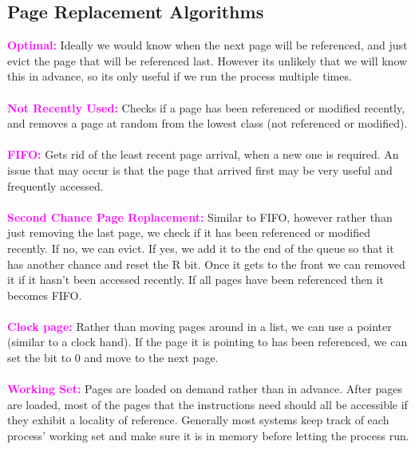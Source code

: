 \documentclass[a4paper,10pt]{article}
\begin{document}
\subsection{Page Replacement Algorithms}
\textcolor{Magenta}{\textbf{Optimal:}} Ideally we would know when the next page will be referenced, and just evict the page that will be referenced last. However its unlikely that we will know this in advance, so its only useful if we run the process multiple times. \\\\
\textcolor{Magenta}{\textbf{Not Recently Used:}} Checks if a page has been referenced or modified recently, and removes a page at random from the lowest class (not referenced or modified). \\\\
\textcolor{Magenta}{\textbf{FIFO:}} Gets rid of the least recent page arrival, when a new one is required. An issue that may occur is that the page that arrived first may be very useful and frequently accessed.\\\\
\textcolor{Magenta}{\textbf{Second Chance Page Replacement:}} Similar to FIFO, however rather than just removing the last page, we check if it has been referenced or modified recently. If no, we can evict. If yes, we add it to the end of the queue so that it has another chance and reset the R bit. Once it gets to the front we can removed it if it hasn't been accessed recently. If all pages have been referenced then it becomes FIFO. \\\\
\textcolor{Magenta}{\textbf{Clock page:}} Rather than moving pages around in a list, we can use a pointer (similar to a clock hand). If the page it is pointing to has been referenced, we can set the bit to 0 and move to the next page. \\\\
\textcolor{Magenta}{\textbf{Working Set:}} Pages are loaded on demand rather than in advance. After pages are loaded, most of the pages that the instructions need should all be accessible if they exhibit a locality of reference. Generally most systems keep track of each process' working set and make sure it is in memory before letting the process run.
\end{document}
